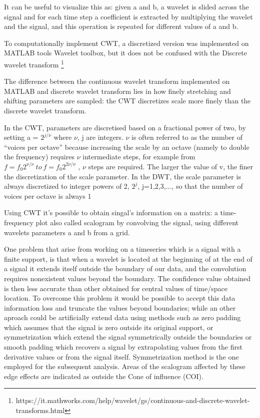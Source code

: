 \documentclass[a4paper,11pt]{article}
\begin{document}
It can be useful to visualize this as: given a and b, a wavelet is slided across the signal and for each time step a coefficient is extracted by multiplying the wavelet and the signal, and this operation is repeated for different values of a and b.

To computationally implement CWT, a discretized version was implemented on MATLAB tools Wavelet toolbox, but it does not be confused with the Discrete wavelet transform \footnote{https://it.mathworks.com/help/wavelet/gs/continuous-and-discrete-wavelet-transforms.html}

The difference between the continuous wavelet transform implemented on MATLAB and discrete wavelet transform lies in how finely stretching and shifting parameters are sampled: the CWT discretizes scale more finely than the discrete wavelet transform.

In the CWT, parameters are discretised based on a fractional power of two, by setting a = $2^{j/\nu}$ \cite{liu-wavelet} \cite{tenlectuerswavelets} where $\nu$, j are integers. $\nu$ is often referred to as the number of “voices per octave” because increasing the scale by an octave (namely to double the frequency) requires $\nu$ intermediate steps, for example from $f = f_0 2^{\nu/\nu} \ to \ f = f_0 2^{2\nu/\nu}$ , $\nu$ steps are required.
The larger the value of v, the finer the discretization of the scale parameter.
In the DWT, the scale parameter is always discretized to integer powers of 2, $2^j$, j=1,2,3,..., so that the number of voices per octave is always 1


Using CWT it's possible to obtain singal's information on a matrix: a time-frequency plot also called scalogram by convolving the signal, using different wavelets parameters a and b from a grid.

One problem that arise from working on a timeseries which is a signal with a finite support, is that when a wavelet is located at the beginning of at the end of a signal it extends itself outside the boundary of our data, and the convolution requires nonexistent values beyond the boundary. The confidence value obtained is then less accurate than other obtained for central values of time/space location.
To overcome this problem it would be possible to accept this data information loss and truncate the values beyond boundaries; while an other aproach could be artificially extend data using methods such as zero padding which assumes that the signal is zero outside its original support, or symmetrization which extend the signal symmetrically outside the boundaries or smooth padding which recovers a signal by extrapolating values from the first derivative values or from the signal itself.
Symmetrization method is the one employed for the subsequent analysis.
Areas of the scalogram affected by these edge effects are indicated as outside the Cone of influence (COI).
\end{document}
